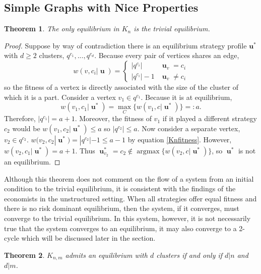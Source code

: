 \documentclass[]{article}
\newtheorem{theorem}{Theorem}
\DeclareMathOperator*{\argmax}{\text{argmax}}
\DeclareMathOperator{\uu}{\mathbf{u}}
\begin{document}
		\subsection{Simple Graphs with Nice Properties}\label{simplegraphswithniceproperties}
		\begin{theorem}\label{KnTheorem}The only equilibrium in $K_n$ is the trivial equilibrium.
		\end{theorem}
		\begin{proof} 
			Suppose by way of contradiction there is an equilibrium strategy profile $\mathbf{u^*}$ with $d\geq2$ clusters, $q^{c_1},...,q^{c_d}$. Because every pair of vertices shares an edge,
			\begin{equation}\label{Knfitness}
				w(v,c_i|\uu)=\begin{cases}
					|q^{c_i}|&\uu_v=c_i\\
					|q^{c_i}|-1&\uu_v\neq c_i
				\end{cases}
			\end{equation} so the fitness of a vertex is directly associated with the size of the cluster of which it is a part.  Consider a vertex $v_1\in q^{c_1}$. Because it is at equilibrium, $$w(v_1,c_1|\uu^*)=\max_C\{w(v_1,c|\uu^*)\}=:a.$$
			Therefore, $|q^{c_1}|=a+1$. Moreover, the fitness of $v_1$ if it played a different strategy $c_2$ would be  $w(v_1,c_2|\uu^*)\leq a$ so $|q^{c_2}|\leq a$.
			Now consider a separate vertex, $v_2\in q^{c_2}$. $w(v_2,c_2|\uu^*)=|q^{c_2}|-1\leq a-1$ by  equation \eqref{Knfitness}. However, $w(v_2,c_1|\uu^*)=a+1$. 
			Thus $\uu^*_{v_2}=c_2\notin \argmax\{w(v_2,c|\uu^*)\}$, so $\uu^*$ is not an equilibrium.  
		\end{proof}

		Although this theorem does not comment on the flow of a system from an initial condition to the trivial equilibrium, it is consistent with the findings of the economists in the unstructured setting. When all strategies offer equal fitness and there is no risk dominant equilibrium, then the system, if it converges, must converge to the trivial equilibrium. In this system, however, it is not necessarily true that the system converges to an equilibrium, it may also converge to a 2-cycle which will be discussed later in the section. 
		
		\begin{theorem}\label{KnnTheorem}{$K_{n,m}$ admits an equilibrium with $d$ clusters if and only if $d|n$ and $d|m$.}
		\end{theorem}
	
\end{document}
